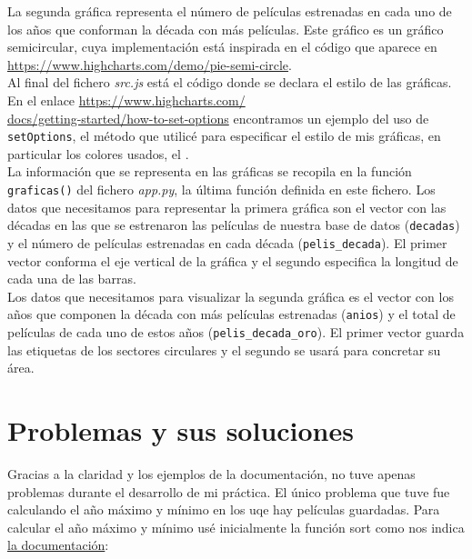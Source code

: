 \documentclass{article}
\begin{document}
La segunda gráfica representa el número de películas estrenadas en cada uno de los años que conforman la década con más películas. Este gráfico es un gráfico semicircular, cuya implementación está inspirada en el código que aparece en  \href{https://www.highcharts.com/demo/pie-semi-circle}{https://www.highcharts.com/demo/pie-semi-circle}.\\

Al final del fichero \textit{src.js} está el código donde se declara el estilo de las gráficas. En el enlace \href{https://www.highcharts.com/docs/getting-started/how-to-set-options}{https://www.highcharts.com/\\docs/getting-started/how-to-set-options} encontramos un ejemplo del uso de \texttt{setOptions}, el método que utilicé para especificar el estilo de mis gráficas, en particular los colores usados, el .\\

La información que se representa en las gráficas se recopila en la función \texttt{graficas()} del fichero \textit{app.py}, la última función definida en este fichero. Los datos que necesitamos para representar la primera gráfica son el vector con las décadas en las que se estrenaron las películas de nuestra base de datos (\texttt{decadas}) y el número de películas estrenadas en cada década (\texttt{pelis\_decada}). El primer vector conforma el eje vertical de la gráfica y el segundo especifica la longitud de cada una de las barras.\\

Los datos que necesitamos para visualizar la segunda gráfica es el vector con los años que componen la década con más películas estrenadas (\texttt{anios}) y el total de películas de cada uno de estos años (\texttt{pelis\_decada\_oro}). El primer vector guarda las etiquetas de los sectores circulares y el segundo se usará para concretar su área.\\

\section{Problemas y sus soluciones}

Gracias a la claridad y los ejemplos de la documentación, no tuve apenas problemas durante el desarrollo de mi práctica. El único problema que tuve fue calculando el año máximo y mínimo en los uqe hay películas guardadas.
Para calcular el año máximo y mínimo usé inicialmente la función sort como nos indica \href{https://docs.mongodb.com/manual/reference/method/cursor.sort/}{la documentación}:
\end{document}

